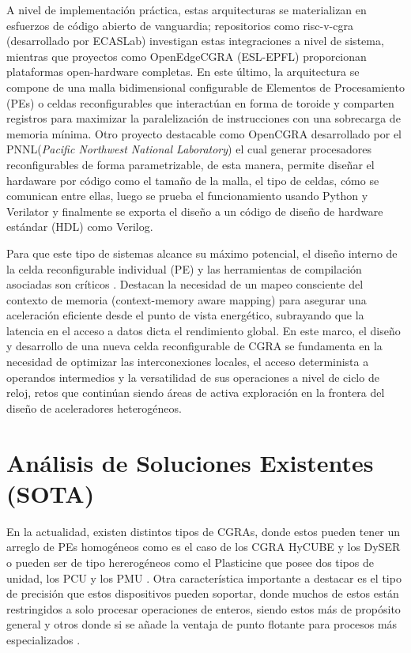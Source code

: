 \documentclass[conference]{IEEEtran}
\begin{document}
A nivel de implementación práctica, estas arquitecturas se materializan en esfuerzos de código abierto de vanguardia; repositorios como risc-v-cgra (desarrollado por ECASLab) investigan estas integraciones a nivel de sistema, mientras que proyectos como OpenEdgeCGRA (ESL-EPFL) proporcionan plataformas open-hardware completas. En este último, la arquitectura se compone de una malla bidimensional configurable de Elementos de Procesamiento (PEs) o celdas reconfigurables que interactúan en forma de toroide y comparten registros para maximizar la paralelización de instrucciones con una sobrecarga de memoria mínima. Otro proyecto destacable como OpenCGRA desarrollado por el PNNL(\textit{Pacific Northwest National Laboratory}) el cual generar procesadores reconfigurables de forma parametrizable, de esta manera, permite diseñar el hardaware por código como el tamaño de la malla, el tipo de celdas, cómo se comunican entre ellas, luego se prueba el funcionamiento usando Python y Verilator y finalmente se exporta el diseño a un código de diseño de hardware estándar (HDL) como Verilog.

Para que este tipo de sistemas alcance su máximo potencial, el diseño interno de la celda reconfigurable individual (PE) y las herramientas de compilación asociadas son críticos \cite{satyajit}. Destacan la necesidad de un mapeo consciente del contexto de memoria (context-memory aware mapping) para asegurar una aceleración eficiente desde el punto de vista energético, subrayando que la latencia en el acceso a datos dicta el rendimiento global. En este marco, el diseño y desarrollo de una nueva celda reconfigurable de CGRA se fundamenta en la necesidad de optimizar las interconexiones locales, el acceso determinista a operandos intermedios y la versatilidad de sus operaciones a nivel de ciclo de reloj, retos que continúan siendo áreas de activa exploración en la frontera del diseño de aceleradores heterogéneos.


\section{Análisis de Soluciones Existentes (SOTA)} %
\label{sec:sota}

En la actualidad, existen distintos tipos de CGRAs, donde estos pueden tener un arreglo de PEs homogéneos como es el caso de los CGRA HyCUBE y los DySER \cite{Blocks2022} o pueden ser de tipo hererogéneos como el Plasticine que posee dos tipos de unidad, los PCU y los PMU \cite{plasticine2017}. Otra característica importante a destacar es el tipo de precisión que estos dispositivos pueden soportar, donde muchos de estos están restringidos a solo procesar operaciones de enteros, siendo estos más de propósito general y otros donde si se añade la ventaja de punto flotante para procesos más especializados \cite{exploration_tradeoffs}. 
\end{document}
